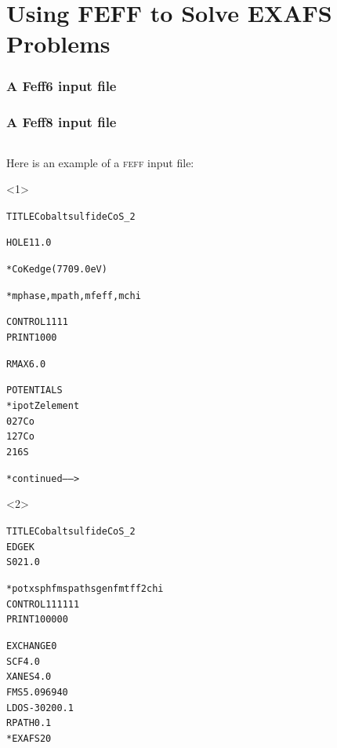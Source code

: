 \documentclass[10pt, xcolor=x11names, compress]{beamer}
\begin{document}
\section[EXAFS]{Using FEFF to Solve EXAFS Problems}

\begin{frame}[fragile]
  \frametitle<1>{A Feff6 input file}
  \frametitle<2>{A Feff8 input file}
  \begin{columns}[T]
    \begin{column}{0.44\linewidth}
      Here is an example of a \textsc{feff} input file:


      \begin{onlyenv}<1>
        \begin{block}{}
          \begin{alltt}
            \tiny
 {\color{Green4}TITLE Cobalt sulfide  CoS\_2}

 {\color{Purple2}HOLE} 1 1.0 {\color{Blue4}*  Co K edge (7709.0 eV)

 *         mphase,mpath,mfeff,mchi}
 {\color{SteelBlue2}CONTROL}   1      1     1     1
 {\color{SteelBlue2}PRINT}     1      0     0     0

 {\color{Purple2}RMAX}        6.0


 {\color{Brown4}POTENTIALS}
 {\color{Blue4}*    ipot   Z  element}
        0   27   Co
        1   27   Co
        2   16   S

                  {\color{Blue4}* continued ------>}
          \end{alltt}
        \end{block}
      \end{onlyenv}
      \begin{onlyenv}<2>
        \begin{block}{}
          \begin{alltt}
            \tiny
 {\color{Green4}TITLE Cobalt sulfide  CoS\_2}
 {\color{Purple2}EDGE} K
 {\color{Purple2}S02}  1.0

 {\color{Blue4} *    pot    xsph  fms   paths genfmt ff2chi}
 {\color{SteelBlue2}CONTROL}   1      1     1     1     1     1
 {\color{SteelBlue2}PRINT}     1      0     0     0     0     0

 {\color{Purple2}EXCHANGE}   0
 {\color{Purple2}SCF}        4.0
 {\color{Purple2}XANES}      4.0
 {\color{Purple2}FMS}        5.09694  0
 {\color{Purple2}LDOS}      -30   20     0.1
 {\color{Purple2}RPATH}      0.1
 {\color{Blue4}*EXAFS     20}


\end{alltt}
\end{block}
\end{onlyenv}
\end{column}
\end{columns}
\end{frame}
\end{document}
